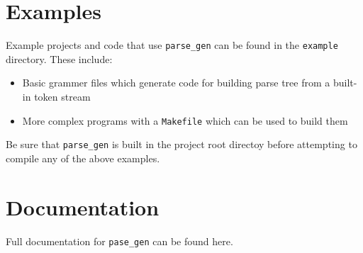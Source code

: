 \documentclass[12pt,a4paper]{article}
\begin{document}
\section*{Examples}

Example projects and code that use \texttt{parse\_gen} can be found in the \texttt{example} directory. These include:
\begin{itemize}
	\item Basic grammer files which generate code for building parse tree from a built-in token stream

	\item More complex programs with a \texttt{Makefile} which can be used to build them
\end{itemize}

Be sure that \texttt{parse\_gen} is built in the project root directoy before attempting to compile any of the above examples.

\section*{Documentation}

Full documentation for \texttt{pase\_gen} can be found here.
\end{document}
